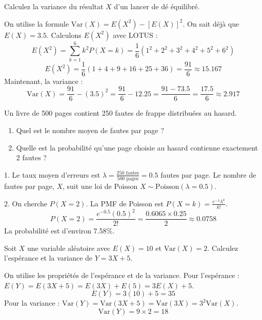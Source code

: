 \begin{exercicebox}[Variance d'un dé]
Calculez la variance du résultat $X$ d'un lancer de dé équilibré.
\end{exercicebox}

\begin{correctionbox}
On utilise la formule $\text{Var}(X) = E(X^2) - [E(X)]^2$.
On sait déjà que $E(X)=3.5$.
Calculons $E(X^2)$ avec LOTUS :
$$ E(X^2) = \sum_{k=1}^6 k^2 P(X=k) = \frac{1}{6}(1^2+2^2+3^2+4^2+5^2+6^2) $$
$$ E(X^2) = \frac{1}{6}(1+4+9+16+25+36) = \frac{91}{6} \approx 15.167 $$
Maintenant, la variance :
$$ \text{Var}(X) = \frac{91}{6} - (3.5)^2 = \frac{91}{6} - 12.25 = \frac{91 - 73.5}{6} = \frac{17.5}{6} \approx 2.917 $$
\end{correctionbox}

\begin{exercicebox}
Un livre de 500 pages contient 250 fautes de frappe distribuées au hasard.
\begin{enumerate}
    \item Quel est le nombre moyen de fautes par page ?
    \item Quelle est la probabilité qu'une page choisie au hasard contienne exactement 2 fautes ?
\end{enumerate}
\end{exercicebox}

\begin{correctionbox}
1. Le taux moyen d'erreurs est $\lambda = \frac{250 \text{ fautes}}{500 \text{ pages}} = 0.5$ fautes par page.
Le nombre de fautes par page, $X$, suit une loi de Poisson $X \sim \text{Poisson}(\lambda=0.5)$.

2. On cherche $P(X=2)$. La PMF de Poisson est $P(X=k) = \frac{e^{-\lambda}\lambda^k}{k!}$.
$$ P(X=2) = \frac{e^{-0.5}(0.5)^2}{2!} = \frac{0.6065 \times 0.25}{2} \approx 0.0758 $$
La probabilité est d'environ 7.58\%.
\end{correctionbox}

\begin{exercicebox}
Soit $X$ une variable aléatoire avec $E(X)=10$ et $\text{Var}(X)=2$. Calculez l'espérance et la variance de $Y = 3X + 5$.
\end{exercicebox}

\begin{correctionbox}
On utilise les propriétés de l'espérance et de la variance.
Pour l'espérance :
$E(Y) = E(3X+5) = E(3X) + E(5) = 3E(X) + 5$.
$$ E(Y) = 3(10) + 5 = 35 $$
Pour la variance :
$\text{Var}(Y) = \text{Var}(3X+5) = \text{Var}(3X) = 3^2 \text{Var}(X)$.
$$ \text{Var}(Y) = 9 \times 2 = 18 $$
\end{correctionbox}


